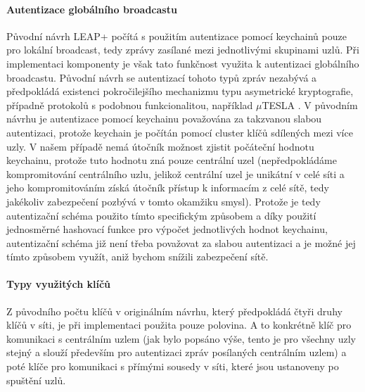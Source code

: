 \documentclass[11pt,final,twoside]{fithesis2}
\begin{document}
\paragraph{Autentizace globálního broadcastu}
Původní návrh LEAP+ počítá s použitím autentizace pomocí keychainů pouze pro lokální broadcast, tedy zprávy zasílané mezi jednotlivými skupinami uzlů. Při implementaci komponenty je však tato funkčnost 
využita k autentizaci globálního broadcastu. Původní návrh se autentizací tohoto typů zpráv nezabývá a předpokládá existenci pokročilejšího mechanizmu typu asymetrické kryptografie, případně protokolů
s podobnou funkcionalitou, například $\mu$TESLA \cite{Perrig2001}. V původním návrhu je autentizace pomocí keychainu považována za takzvanou slabou autentizaci, protože keychain je počítán pomocí 
cluster klíčů sdílených mezi více uzly. V našem případě nemá útočník možnost zjistit počáteční hodnotu keychainu, protože tuto hodnotu zná pouze centrální uzel (nepředpokládáme kompromitování centrálního
uzlu, jelikož centrální uzel je unikátní v celé síti a jeho kompromitováním získá útočník přístup k informacím z celé sítě, tedy jakékoliv zabezpečení pozbývá v tomto okamžiku smysl). Protože je tedy 
autentizační schéma použito tímto specifickým způsobem a díky použití jednosměrné hashovací funkce pro výpočet jednotlivých hodnot keychainu, autentizační schéma již není třeba považovat za slabou 
autentizaci a je možné jej tímto způsobem využít, aniž bychom snížili zabezpečení sítě.

\paragraph{Typy využitých klíčů}
Z původního počtu klíčů v originálním návrhu, který předpokládá čtyři druhy klíčů v síti, je při implementaci použita pouze polovina. A to konkrétně klíč pro komunikaci s centrálním uzlem (jak bylo popsáno 
výše, tento je pro všechny uzly stejný a slouží především pro autentizaci zpráv posílaných centrálním uzlem) a poté klíče pro komunikaci s přímými sousedy v síti, které jsou ustanoveny po spuštění uzlů. 
\end{document}
